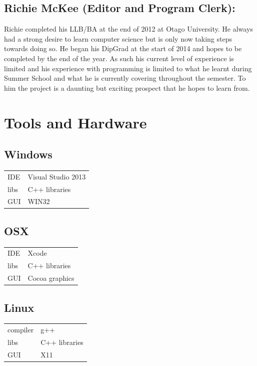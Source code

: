 \documentclass[a4paper,11pt]{article}
\begin{document}
\subsection*{Richie McKee (Editor and Program Clerk):}
Richie completed his LLB/BA at the end of 2012 at Otago University. He always had a strong desire to learn computer science but is only now taking steps towards doing so. He began his DipGrad at the start of 2014 and hopes to be completed by the end of the year. As such his current level of experience is limited and his experience with programming is limited to what he learnt during Summer School and what he is currently covering throughout the semester. To him the project is a daunting but exciting prospect that he hopes to learn from.

\pagebreak


\section{Tools and Hardware}

\begin{multicols}{3}

\subsection*{Windows}
\begin{tabular}{l l}
  IDE & Visual Studio 2013 \\
  libs & C++ libraries \\
  GUI & WIN32 \\
\end{tabular}

\subsection*{OSX}
\begin{tabular}{l l}
IDE & Xcode \\
libs & C++ libraries \\
GUI & Cocoa graphics \\
\end{tabular}

\subsection*{Linux}
\begin{tabular}{l l}
  compiler &  g++ \\
  libs & C++ libraries \\
  GUI & X11 \\
\end{tabular}

\end{multicols}
\end{document}

